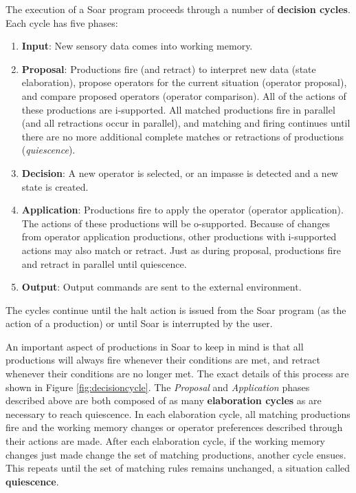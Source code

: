 The execution of a Soar program proceeds through a number of \textbf{decision cycles}. Each cycle has five phases:

\begin{enumerate} 
	\item \textbf{Input}: 
		New sensory data comes into working memory.
	\item \textbf{Proposal}: 
		Productions fire (and retract) to interpret new data (state elaboration), propose operators for the current situation (operator proposal), and compare proposed operators (operator comparison).  All of the actions of these productions are i-supported.  All matched productions fire in parallel (and all retractions occur in parallel), and matching and firing continues until there are no more additional complete matches or retractions of productions (\emph{quiescence}). 
	\item \textbf{Decision}:
		A new operator is selected, or an impasse is detected and a new state is created.
	\item \textbf{Application}: 
		Productions fire to apply the operator (operator application).  The actions of these productions will be o-supported. Because of changes from operator application productions, other productions with i-supported actions may also match or retract. Just as during proposal, productions fire and retract in parallel until quiescence.
	\item \textbf{Output}: 
		Output commands are sent to the external environment.
\end{enumerate}

The cycles continue until the halt action is issued from the Soar program (as the action of a production) or until Soar is interrupted by the user.

An important aspect of productions in Soar to keep in mind is that all productions will always fire whenever their conditions are met, and retract whenever their conditions are no longer met. The exact details of this process are shown in Figure \ref{fig:decisioncycle}. The \emph{Proposal} and \emph{Application} phases described above are both composed of as many \textbf{elaboration cycles} as are necessary to reach quiescence. In each elaboration cycle, all matching productions fire and the working memory changes or operator preferences described through their actions are made. After each elaboration cycle, if the working memory changes just made change the set of matching productions, another cycle ensues. This repeats until the set of matching rules remains unchanged, a situation called \textbf{quiescence}.


